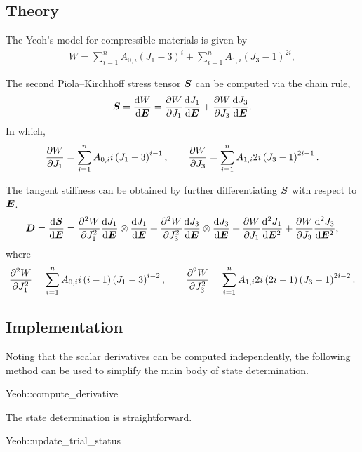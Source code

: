 \subsection{Theory}
The Yeoh's model for compressible materials is given by
\begin{gather}
    W=\sum_{i=1}^nA_{0,i}\left(J_1-3\right)^i+\sum_{i=1}^nA_{1,i}\left(J_3-1\right)^{2i},
\end{gather}

The second Piola--Kirchhoff stress tensor $\bm{S}$ can be computed via the chain rule,
\begin{gather}
    \bm{S}=\dfrac{\mathrm{d}W}{\mathrm{d}\bm{E}}=\dfrac{\partial{W}}{\partial{J_1}}\dfrac{\mathrm{d}J_1}{\mathrm{d}\bm{E}}+\dfrac{\partial{W}}{\partial{J_3}}\dfrac{\mathrm{d}J_3}{\mathrm{d}\bm{E}}.
\end{gather}
In which,
\begin{gather}
    \dfrac{\partial{W}}{\partial{J_1}}=\sum_{i=1}^nA_{0,i}i\left(J_1-3\right)^{i-1},\qquad
    \dfrac{\partial{W}}{\partial{J_3}}=\sum_{i=1}^nA_{1,i}2i\left(J_3-1\right)^{2i-1}.
\end{gather}

The tangent stiffness can be obtained by further differentiating $\bm{S}$ with respect to $\bm{E}$.
\begin{gather}
    \bm{D}=\dfrac{\mathrm{d}\bm{S}}{\mathrm{d}\bm{E}}=\dfrac{\partial{^2W}}{\partial{J_1^2}}\dfrac{\mathrm{d}J_1}{\mathrm{d}\bm{E}}\otimes\dfrac{\mathrm{d}J_1}{\mathrm{d}\bm{E}}+\dfrac{\partial{^2W}}{\partial{J_3^2}}\dfrac{\mathrm{d}J_3}{\mathrm{d}\bm{E}}\otimes\dfrac{\mathrm{d}J_3}{\mathrm{d}\bm{E}}+\dfrac{\partial{W}}{\partial{J_1}}\dfrac{\mathrm{d}^2J_1}{\mathrm{d}\bm{E}^2}+\dfrac{\partial{W}}{\partial{J_3}}\dfrac{\mathrm{d}^2J_3}{\mathrm{d}\bm{E}^2},
\end{gather}
where
\begin{gather}
    \dfrac{\partial{^2W}}{\partial{J_1^2}}=\sum_{i=1}^nA_{0,i}i\left(i-1\right)\left(J_1-3\right)^{i-2},\qquad
    \dfrac{\partial{^2W}}{\partial{J_3^2}}=\sum_{i=1}^nA_{1,i}2i\left(2i-1\right)\left(J_3-1\right)^{2i-2}.
\end{gather}
\subsection{Implementation}
Noting that the scalar derivatives can be computed independently, the following method can be used to simplify the main body of state determination.
\begin{cppcode}
Yeoh::compute_derivative
\end{cppcode}

The state determination is straightforward.
\begin{cppcode}
Yeoh::update_trial_status
\end{cppcode}
